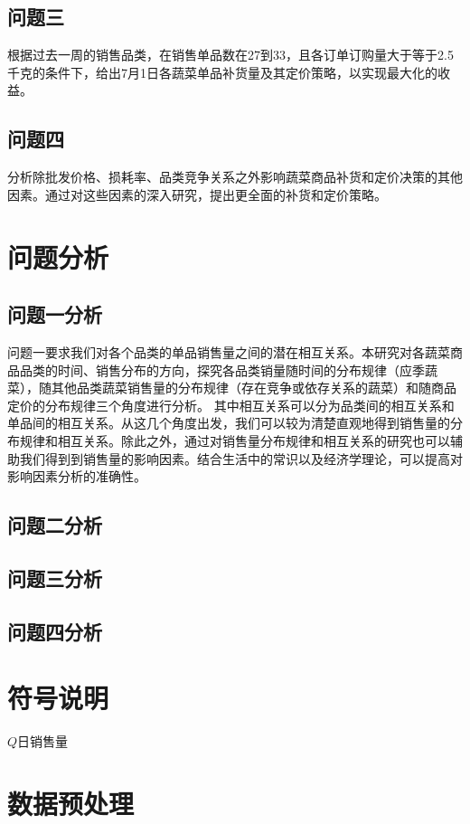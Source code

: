 \documentclass{article}
\begin{document}
\subsection{问题三}

根据过去一周的销售品类，在销售单品数在27到33，且各订单订购量大于等于2.5千克的条件下，给出7月1日各蔬菜单品补货量及其定价策略，以实现最大化的收益。
\subsection{问题四}

分析除批发价格、损耗率、品类竞争关系之外影响蔬菜商品补货和定价决策的其他因素。通过对这些因素的深入研究，提出更全面的补货和定价策略。
\section{问题分析}

\subsection{问题一分析}
问题一要求我们对各个品类的单品销售量之间的潜在相互关系。本研究对各蔬菜商品品类的时间、销售分布的方向，探究各品类销量随时间的分布规律（应季蔬菜），随其他品类蔬菜销售量的分布规律（存在竞争或依存关系的蔬菜）和随商品定价的分布规律三个角度进行分析。
其中相互关系可以分为品类间的相互关系和单品间的相互关系。从这几个角度出发，我们可以较为清楚直观地得到销售量的分布规律和相互关系。除此之外，通过对销售量分布规律和相互关系的研究也可以辅助我们得到到销售量的影响因素。结合生活中的常识以及经济学理论，可以提高对影响因素分析的准确性。

\subsection{问题二分析}


\subsection{问题三分析}

\subsection{问题四分析}

\section{符号说明}

$ Q $日销售量
\section{数据预处理}
\end{document}
